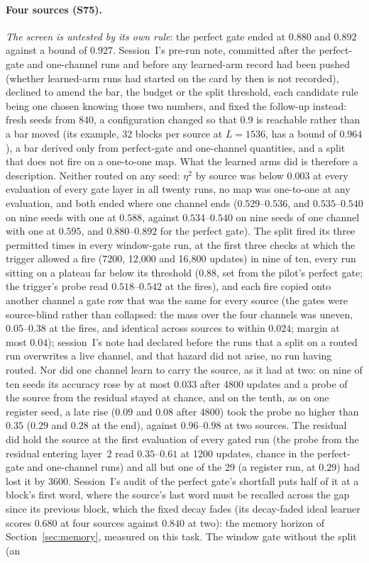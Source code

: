 \documentclass[11pt]{article}
\begin{document}
\paragraph{Four sources (S75).} \emph{The screen is untested by its own rule}: the perfect gate ended at $0.880$ and $0.892$ against a bound of $0.927$. Session~I's pre-run note, committed after the perfect-gate and one-channel runs and before any learned-arm record had been pushed (whether learned-arm runs had started on the card by then is not recorded), declined to amend the bar, the budget or the split threshold, each candidate rule being one chosen knowing those two numbers, and fixed the follow-up instead: fresh seeds from 840, a configuration changed so that $0.9$ is reachable rather than a bar moved (its example, 32 blocks per source at $L = 1536$, has a bound of $0.964$), a bar derived only from perfect-gate and one-channel quantities, and a split that does not fire on a one-to-one map. What the learned arms did is therefore a description. Neither routed on any seed: $\eta^2$ by source was below $0.003$ at every evaluation of every gate layer in all twenty runs, no map was one-to-one at any evaluation, and both ended where one channel ends ($0.529$--$0.536$, and $0.535$--$0.540$ on nine seeds with one at $0.588$, against $0.534$--$0.540$ on nine seeds of one channel with one at $0.595$, and $0.880$--$0.892$ for the perfect gate). The split fired its three permitted times in every window-gate run, at the first three checks at which the trigger allowed a fire (7200, 12{,}000 and 16{,}800 updates) in nine of ten, every run sitting on a plateau far below its threshold ($0.88$, set from the pilot's perfect gate; the trigger's probe read $0.518$--$0.542$ at the fires), and each fire copied onto another channel a gate row that was the same for every source (the gates were source-blind rather than collapsed: the mass over the four channels was uneven, $0.05$--$0.38$ at the fires, and identical across sources to within $0.024$; margin at most $0.04$); session~I's note had declared before the runs that a split on a routed run overwrites a live channel, and that hazard did not arise, no run having routed. Nor did one channel learn to carry the source, as it had at two: on nine of ten seeds its accuracy rose by at most $0.033$ after 4800 updates and a probe of the source from the residual stayed at chance, and on the tenth, as on one register seed, a late rise ($0.09$ and $0.08$ after 4800) took the probe no higher than $0.35$ ($0.29$ and $0.28$ at the end), against $0.96$--$0.98$ at two sources. The residual did hold the source at the first evaluation of every gated run (the probe from the residual entering layer~2 read $0.35$--$0.61$ at 1200 updates, chance in the perfect-gate and one-channel runs) and all but one of the 29 (a register run, at $0.29$) had lost it by 3600. Session~I's audit of the perfect gate's shortfall puts half of it at a block's first word, where the source's last word must be recalled across the gap since its previous block, which the fixed decay fades (its decay-faded ideal learner scores $0.680$ at four sources against $0.840$ at two): the memory horizon of Section~\ref{sec:memory}, measured on this task. The window gate without the split (an 
\end{document}
